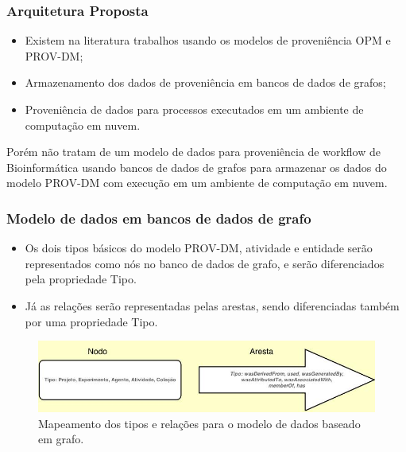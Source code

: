 \documentclass{beamer}
\begin{document}
\begin{frame}
\frametitle{Arquitetura Proposta}
\begin{itemize}
\item Existem na literatura trabalhos usando os modelos de
  proveni\^encia OPM e PROV-DM;
\item Armazenamento dos dados de proveni\^encia em bancos de dados de
  grafos; 
\item Proveni\^encia de dados para processos executados em um ambiente
  de computa\c{c}\~ao em nuvem.
\end{itemize}
\begin{block}{}
Por\'em n\~ao tratam de um modelo de dados para proveni\^encia de
workflow de Bioinform\'atica usando bancos de dados de grafos para
armazenar os dados do modelo PROV-DM com execu\c{c}\~ao em um ambiente
de computa\c{c}\~ao em nuvem.
\end{block}
\end{frame}


\begin{frame}
\frametitle{Modelo de dados em bancos de dados de grafo}
\begin{itemize}
\item Os dois tipos b\'asicos do modelo PROV-DM, atividade e entidade
  ser\~ao representados como n\'os no banco de dados de grafo, e
  ser\~ao diferenciados pela propriedade Tipo.
\item J\'a as rela\c{c}\~oes ser\~ao representadas pelas arestas,
  sendo diferenciadas tamb\'em por uma propriedade Tipo. 
\end{itemize}
\begin{figure}[h!]
\centering
\includegraphics[width=350pt]{images/NodoEAresta.jpg}
\caption{Mapeamento dos tipos e rela\c{c}\~oes para o modelo de dados baseado em grafo.}
\label{fig:nodoaresta}
\end{figure}
\end{frame}

\end{document}
